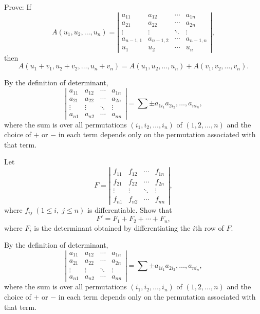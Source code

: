 \documentclass{ximera}
\begin{document}
\begin{problem}\label{exer:9.1.17}
Prove:  If
$$
A(u_1,u_2,\dots,u_n)=
\left|\begin{array}{cccc}
a_{11}&a_{12}&\cdots&a_{1n}\\ 
a_{21}&a_{22}&\cdots&a_{2n}\\ 
\vdots&\vdots&\ddots&\vdots\\ 
a_{n-1,1}&a_{n-1,2}&\cdots&a_{n-1,n}\\ 
u_1&u_2&\cdots&u_n\end{array}\right|,
$$
then
$$
A(u_1+v_1, u_2+v_2,\dots,
  u_n+v_n)=A(u_1,u_2,\dots,u_n)+A(v_1,v_2,\dots,
  v_n).
$$

\begin{hint}
By the definition of determinant,
$$
\left|\begin{array}{cccc}
a_{11}&a_{12}&\cdots&a_{1n}\\ 
a_{21}&a_{22}&\cdots&a_{2n}\\ 
\vdots&\vdots&\ddots&\vdots\\ 
a_{n1}&a_{n2}&\cdots&a_{nn}\end{array}\right|
=\sum\pm a_{1i_1}a_{2i_2},\dots,a_{ni_n},
$$
where the sum is over all permutations $(i_1,i_2,\dots,i_n)$ of
$(1,2,\dots, n)$ and the choice of $+$ or $-$ in each term depends
only on the permutation associated with that term.
\end{hint}
\end{problem}

\begin{problem}\label{exer:9.1.18}
Let
$$
F=\left|\begin{array}{cccc}
f_{11}&f_{12}&\cdots&f_{1n}\\ 
f_{21}&f_{22}&\cdots&f_{2n}\\ 
\vdots&\vdots&\ddots&\vdots\\ 
f_{n1}&f_{n2}&\cdots&f_{nn}\end{array}\right|,
$$
where $f_{ij}\; (1\le i,\;   j\le n)$ is differentiable.  Show that
$$
F'=F_1+F_2+\cdots+F_n,
$$
where $F_i$ is the determinant obtained by differentiating the
$i$th row of $F$.

\begin{hint}
By the definition of determinant,
$$
\left|\begin{array}{cccc}
a_{11}&a_{12}&\cdots&a_{1n}\\ 
a_{21}&a_{22}&\cdots&a_{2n}\\ 
\vdots&\vdots&\ddots&\vdots\\ 
a_{n1}&a_{n2}&\cdots&a_{nn}\end{array}\right|
=\sum\pm a_{1i_1}a_{2i_2},\dots,a_{ni_n},
$$
where the sum is over all permutations $(i_1,i_2,\dots,i_n)$ of
$(1,2,\dots, n)$ and the choice of $+$ or $-$ in each term depends
only on the permutation associated with that term.
\end{hint}
\end{problem}
\end{document}
